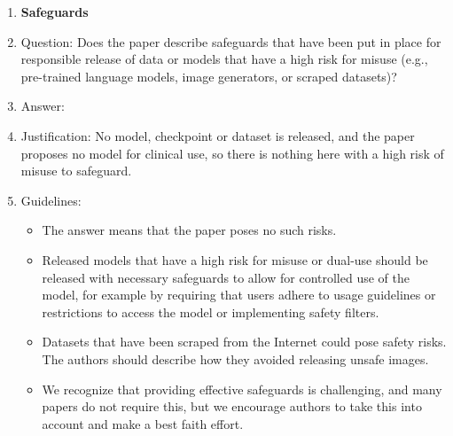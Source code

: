 \begin{enumerate}
\item {\bf Safeguards}
    \item[] Question: Does the paper describe safeguards that have been put in place for responsible release of data or models that have a high risk for misuse (e.g., pre-trained language models, image generators, or scraped datasets)?
    \item[] Answer: \answerNA{}
    \item[] Justification: No model, checkpoint or dataset is released, and the paper proposes no model for clinical use, so there is nothing here with a high risk of misuse to safeguard.
    \item[] Guidelines:
    \begin{itemize}
        \item The answer \answerNA{} means that the paper poses no such risks.
        \item Released models that have a high risk for misuse or dual-use should be released with necessary safeguards to allow for controlled use of the model, for example by requiring that users adhere to usage guidelines or restrictions to access the model or implementing safety filters. 
        \item Datasets that have been scraped from the Internet could pose safety risks. The authors should describe how they avoided releasing unsafe images.
        \item We recognize that providing effective safeguards is challenging, and many papers do not require this, but we encourage authors to take this into account and make a best faith effort.
    \end{itemize}


\end{enumerate}
